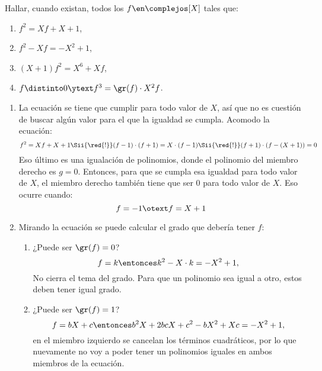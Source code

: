 \begin{enunciado}{\ejercicio}
  Hallar, cuando existan, todos los $f \en \complejos[X]$ tales que:
  \begin{multicols}{2}
    \begin{enumerate}[label=\roman*)]
      \item $f^2 = Xf + X + 1$,
      \item $f^2 - Xf = - X^2 + 1$,
      \item $(X+1)f^2 = X^6 + Xf$,
      \item $f \distinto 0 \ytext f^3 = \gr(f) \cdot X^2f$.
    \end{enumerate}
  \end{multicols}
\end{enunciado}

\begin{enumerate}[label=\roman*)]
  \item
        La ecuación se tiene que cumplir para todo valor de $X$, así que no es cuestión de buscar algún valor para el que la igualdad se cumpla.
        Acomodo la ecuación:
        $$
          f^2 = Xf + X + 1
          \Sii{\red{!}}
          (f-1) \cdot (f + 1) = X \cdot (f - 1)
          \Sii{\red{!}}
          (f+1) \cdot (f - (X+1)) = 0
        $$
        Eso último es una igualación de polinomios, donde el polinomio del miembro derecho es $g=0$. Entonces, para que
        se cumpla esa igualdad para todo valor de $X$, el miembro derecho también tiene que ser 0 para todo valor de $X$.
        Eso ocurre cuando:
        $$
          f = -1 \otext f = X + 1
        $$

  \item Mirando la ecuación se puede calcular el grado que debería tener $f$:
        \begin{enumerate}[label=\tiny\faIcon{calculator}$_{\arabic*}$)]
          \item ¿Puede ser $\gr(f) = 0$?
                $$
                  f = k \entonces k^2 - X \cdot k = -X^2 + 1,
                $$
                No cierra el tema del grado. Para que un polinomio sea igual a otro, estos deben tener igual grado.
          \item ¿Puede ser $\gr(f) = 1$?
                $$
                  f = bX + c \entonces b^2X + 2bcX + c^2 - bX^2 + Xc = -X^2 + 1,
                $$
                en el miembro izquierdo se cancelan los términos cuadráticos, por lo que nuevamente no voy a poder tener un polinomios iguales
                en ambos miembros de la ecuación.


\end{enumerate}
\end{enumerate}
